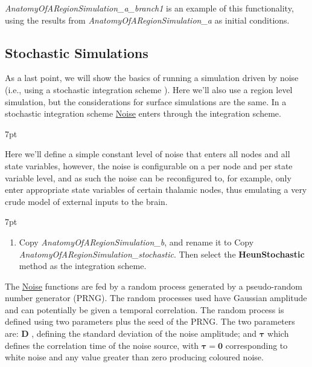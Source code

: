 \documentclass{tufte-handout}
\newenvironment{simulation}{%
  \def\FrameCommand{%
    \hspace{1pt}%
    {\color{ForestGreen}\vrule width 2pt}%
    {\color{simulationshade}\vrule width 4pt}%
    \colorbox{simulationshade}%
  }%
  \MakeFramed{\advance\hsize-\width\FrameRestore}%
  \noindent\hspace{-4.55pt}%
  \begin{adjustwidth}{}{7pt}%
  \vspace{2pt}\vspace{2pt}%
}
{%
  \vspace{2pt}\end{adjustwidth}\endMakeFramed%
}
\newenvironment{blah}{%
  \def\FrameCommand{%
    \hspace{1pt}%
    {\color{DarkOrange}\vrule width 2pt}%
    {\color{PeachPuff}\vrule width 4pt}%
    \colorbox{PeachPuff}%
  }%
  \MakeFramed{\advance\hsize-\width\FrameRestore}%
  \noindent\hspace{-4.55pt}%
  \begin{adjustwidth}{}{7pt}%
  \vspace{2pt}\vspace{2pt}%
}
{%
  \vspace{2pt}\end{adjustwidth}\endMakeFramed%
}
\begin{document}
\textit{AnatomyOfARegionSimulation\_a\_branch1} is an example of this functionality, using the results from \textit{AnatomyOfARegionSimulation\_a} as initial conditions. 

\subsection{Stochastic Simulations}\label{sec:noisy_simulations}


As a last point, we will show the basics of running a simulation driven by
noise (i.e., using a stochastic integration scheme ). Here we'll also use a region level simulation, but the
considerations for surface simulations are the same. In a stochastic
integration scheme \underline{Noise} enters through the integration scheme.

\begin{blah}
\begin{itemize}
Here we'll define a simple constant level of noise that enters all
nodes and all state variables, however, the noise is configurable on a per
node and per state variable level, and as such the noise can be reconfigured
to, for example, only enter appropriate state variables of certain thalamic
nodes, thus emulating a very crude model of external inputs to the brain. 
\end{itemize}
\end{blah}

\begin{simulation}
\begin{enumerate}
\item Copy \textit{AnatomyOfARegionSimulation\_b}, and rename it to Copy \textit{AnatomyOfARegionSimulation\_stochastic}.
Then select the \textbf{HeunStochastic} method as the integration scheme.  
\end{enumerate}
\end{simulation}

The \underline{Noise} functions are fed by a random process generated by a
pseudo-random number generator (PRNG). The random processes used have Gaussian
amplitude and can potentially be given a temporal correlation. The random
process is defined using two parameters plus the seed of the PRNG. The two
parameters are: $\mathbf{D}$ ,
defining the standard deviation of the noise amplitude; and
$\boldsymbol{\tau}$ which defines the correlation time of the noise source,
with $\boldsymbol{\tau = 0}$ corresponding to white noise and any value
greater than zero producing coloured noise.
\end{document}
